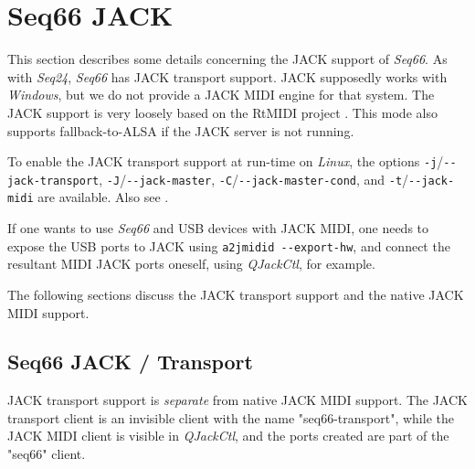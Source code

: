 %
%
%

\section{Seq66 JACK}
\label{sec:jack}

   This section describes some details concerning the JACK support of
   \textsl{Seq66}.
   As with \textsl{Seq24}, \textsl{Seq66} has JACK transport support.
   JACK supposedly works with \textsl{Windows}, but we do not provide a JACK
   MIDI engine for that system.
   The JACK support is very loosely based on the RtMIDI project
   \cite{rtmidi}.
   This mode also supports fallback-to-ALSA if the JACK
   server is not running.

   To enable the JACK transport support at run-time on
   \textsl{Linux}, the options
   \texttt{-j}/\texttt{-{}-jack-transport},
   \texttt{-J}/\texttt{-{}-jack-master},
   \texttt{-C}/\texttt{-{}-jack-master-cond},
   and \texttt{-t}/\texttt{-{}-jack-midi} are available.
   Also see .

   If one wants to use \textsl{Seq66} and USB devices
   with JACK MIDI, one needs to expose the USB ports to JACK using
   \texttt{a2jmidid -{}-export-hw}, and connect the resultant MIDI JACK ports
   oneself, using \textsl{QJackCtl}, for example.

   The following sections discuss the JACK transport support and the native
   JACK MIDI support.

\subsection{Seq66 JACK / Transport}
\label{subsec:jack_transport}

   JACK transport support is \textsl{separate} from native JACK MIDI support.
   The JACK transport client is an invisible client with the
   name "seq66-transport", while the JACK MIDI client is visible in
   \textsl{QJackCtl}, and the ports created are part of the
   "seq66" client.

